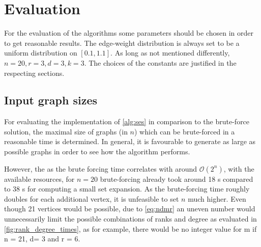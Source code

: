 \chapter{Evaluation}\label{chapter:Evaluation}
For the evaluation of the algorithms some parameters should be chosen in order to get reasonable results. The edge-weight distribution is always set to be a uniform distribution on $[0.1, 1.1]$. As long as not mentioned differently, $n = 20, r = 3, d = 3, k = 3$.  The choices of the constants are justified in the respecting sections.



\section{Input graph sizes}
For evaluating the implementation of \cref{alg:ses} in comparison to the brute-force solution, the maximal size of graphs (in $n$) which can be brute-forced in a reasonable time is determined. In general, it is favourable to generate as large as possible graphs in order to see how the algorithm performs.

However, the as the brute forcing time correlates with around $ \mathcal{O}(2^n)$, with the available resources, for $n=20$ brute-forcing already took around 18 s compared to 38 s for computing a small set expansion. As the brute-forcing time roughly doubles for each additional vertex, it is unfeasible to set $n$ much higher. Even though 21 vertices would be possible, due to \cref{eq:ndmr} an uneven number would unnecessarily limit the possible combinations of ranks and degree as evaluated in \cref{fig:rank_degree_times}, as for example, there would be no integer value for m if n = 21, d= 3 and r = 6.

